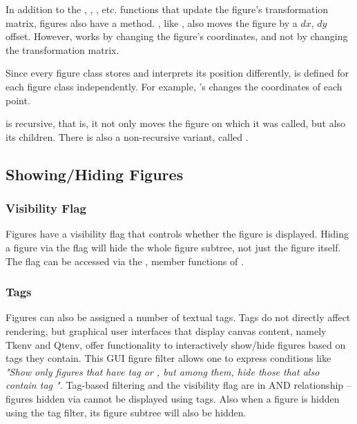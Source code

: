 In addition to the , , ,
etc. functions that update the figure's transformation matrix, figures also
have a  method. , like ,
also moves the figure by a $dx$, $dy$ offset. However,  works
by changing the figure's coordinates, and not by changing the
transformation matrix.

Since every figure class stores and interprets its position differently,
 is defined for each figure class independently. For example,
's  changes the coordinates of each point.

 is recursive, that is, it not only moves the figure on which
it was called, but also its children. There is also a non-recursive variant,
called .


\subsection{Showing/Hiding Figures}
\label{sec:graphics:showing-hiding-figures}

\subsubsection{Visibility Flag}
\label{sec:graphics:figure-visibility-flag}

Figures have a visibility flag that controls whether the figure is
displayed. Hiding a figure via the flag will hide the whole figure subtree,
not just the figure itself. The flag can be accessed via the
,  member functions of
.

\subsubsection{Tags}
\label{sec:graphics:figure-tags}

Figures can also be assigned a number of textual tags. Tags do not directly
affect rendering, but graphical user interfaces that display canvas
content, namely Tkenv and Qtenv, offer functionality to interactively
show/hide figures based on tags they contain. This GUI figure filter allows
one to express conditions like \textit{"Show only figures that have tag
 or , but among them, hide those that also contain
tag ".} Tag-based filtering and the visibility flag are in AND
relationship -- figures hidden via  cannot be
displayed using tags. Also when a figure is hidden using the tag filter,
its figure subtree will also be hidden.

